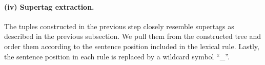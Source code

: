 \documentclass[../document.tex]{subfiles}
\begin{document}
    \paragraph{(iv) Supertag extraction.}
    The tuples constructed in the previous step closely resemble supertags as described in the previous subsection.
    We pull them from the constructed tree and order them according to the sentence position included in the lexical rule.
    Lastly, the sentence position in each rule is replaced by a wildcard symbol ``\_''.

    \ifSubfilesClassLoaded{%
        \printindex
    }{}
\end{document}
